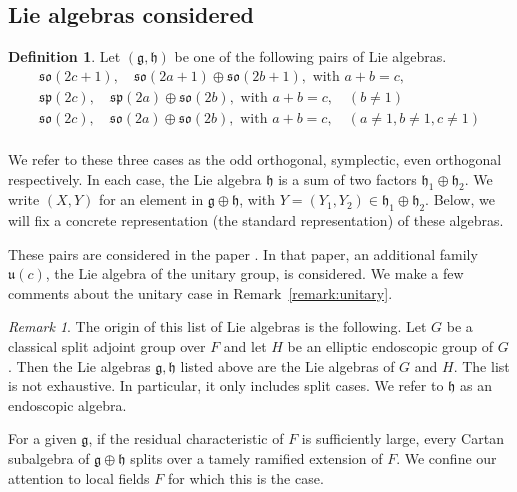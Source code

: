\documentclass[11pt]{amsart}
\theoremstyle{definition}
\newtheorem{definition}[theorem]{Definition}
\theoremstyle{remark}
\newtheorem{remark}[theorem]{Remark}
\numberwithin{equation}{theorem}
\def\lie#1{{\mathfrak{#1}}}
\begin{document}
\subsection{Lie algebras considered}

\begin{definition}{\label{def:pairs}}
Let $(\lie{g},\lie{h})$ be one of the following pairs of Lie
algebras.
    \begin{equation}
    \begin{array}{lll}
    \lie{so}(2c+1),\quad \lie{so}(2a+1) \oplus \lie{so}(2b+1), \text{ with }
a+b=c,\\
    \lie{sp}(2c),\quad \lie{sp} (2a)\oplus \lie{so}(2b), \text{ with } a+b =
c,\quad (b\ne1)\\
    \lie{so}(2c),\quad \lie{so}(2a)\oplus \lie{so}(2b),\text{ with } a + b =
c,\quad (a\ne1,b \ne1, c\ne1)\\
    \end{array}
    \end{equation}
\end{definition}

We refer to these three cases as the odd orthogonal, symplectic,
even orthogonal respectively.  In each case, the Lie algebra
$\lie{h}$ is a sum of two factors $\lie{h}_1\oplus \lie{h}_2$. We
write $(X,Y)$ for an element in $\lie{g}\oplus\lie{h}$, with $Y=
(Y_1,Y_2)\in\lie{h}_1\oplus\lie{h}_2$.  Below, we will fix a
concrete representation (the standard representation) of these
algebras.

These pairs are considered in the paper \cite{VTF}.  In that
paper, an additional family $\lie{u}(c)$, the Lie algebra of the
unitary group, is considered.  We make a few comments about the
unitary case in Remark~\ref{remark:unitary}.

\begin{remark}
The origin of this list of Lie algebras is the following. Let $G$
be a classical split adjoint group over $F$ and let $H$ be an
elliptic endoscopic group of $G$. Then the Lie algebras
$\lie{g},\lie{h}$ listed above are the Lie algebras of $G$ and
$H$. The list is not exhaustive.  In particular, it only includes
split cases.  We refer to $\lie{h}$ as an endoscopic algebra.
\end{remark}

For a given $\lie{g}$, if the residual characteristic of $F$ is
sufficiently large,  every Cartan subalgebra of
$\lie{g}\oplus\lie{h}$ splits over a tamely ramified extension of
$F$.  We confine our attention to local fields $F$ for which this
is the case.
\end{document}
